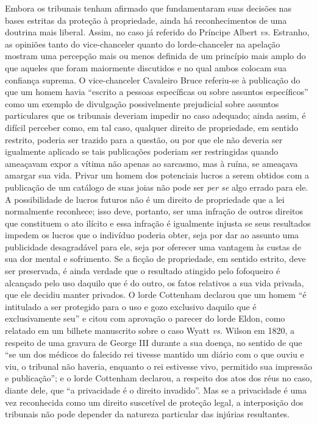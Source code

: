 Embora os tribunais tenham afirmado que fundamentaram suas decisões nas
bases estritas da proteção à propriedade, ainda há reconhecimentos de
uma doutrina mais liberal. Assim, no caso já referido do Príncipe Albert
\emph{vs.} Estranho, as opiniões tanto do vice-chanceler quanto do
lorde-chanceler na apelação mostram uma percepção mais ou menos definida
de um princípio mais amplo do que aqueles que foram maiormente
discutidos e no qual ambos colocam sua confiança suprema. O
vice-chanceler Cavaleiro Bruce referiu-se à publicação do que um homem
havia ``escrito a pessoas específicas ou sobre assuntos específicos''
como um exemplo de divulgação possivelmente prejudicial sobre assuntos
particulares que os tribunais deveriam impedir no caso adequado; ainda
assim, é difícil perceber como, em tal caso, qualquer direito de
propriedade, em sentido restrito, poderia ser trazido para a questão, ou
por que ele não deveria ser igualmente aplicado se tais publicações
poderiam ser restringidas quando ameaçavam expor a vítima não apenas ao
sarcasmo, mas à ruína, se ameaçava amargar sua vida. Privar um homem dos
potenciais lucros a serem obtidos com a publicação de um catálogo de
suas joias não pode ser \emph{per se} algo errado para ele. A
possibilidade de lucros futuros não é um direito de propriedade que a
lei normalmente reconhece; isso deve, portanto, ser uma infração de
outros direitos que constituem o ato ilícito e essa infração é
igualmente injusta se seus resultados impedem os lucros que o indivíduo
poderia obter, seja por dar ao assunto uma publicidade desagradável para
ele, seja por oferecer uma vantagem às custas de sua dor mental e
sofrimento. Se a ficção de propriedade, em sentido estrito, deve ser
preservada, é ainda verdade que o resultado atingido pelo fofoqueiro é
alcançado pelo uso daquilo que é do outro, os fatos relativos a sua vida
privada, que ele decidiu manter privados. O lorde Cottenham declarou que
um homem ``é intitulado a ser protegido para o uso e gozo exclusivo
daquilo que é exclusivamente seu'' e citou com aprovação o parecer do
lorde Eldon, como relatado em um bilhete manuscrito sobre o caso Wyatt
\emph{vs.} Wilson em 1820, a respeito de uma gravura de George III
durante a sua doença, no sentido de que ``se um dos médicos do falecido
rei tivesse mantido um diário com o que ouviu e viu, o tribunal não
haveria, enquanto o rei estivesse vivo, permitido sua impressão e
publicação''; e o lorde Cottenham declarou, a respeito dos atos dos réus
no caso, diante dele, que ``a privacidade é o direito invadido''. Mas se
a privacidade é uma vez reconhecida como um direito suscetível de
proteção legal, a interposição dos tribunais não pode depender da
natureza particular das injúrias resultantes.

